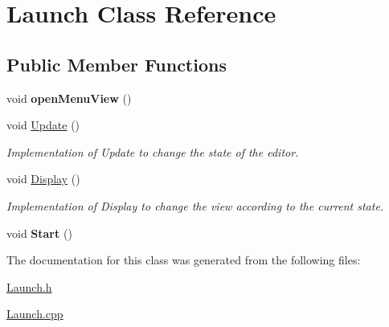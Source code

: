 \hypertarget{class_launch}{}\section{Launch Class Reference}
\label{class_launch}
\subsection*{Public Member Functions}
\begin{DoxyCompactItemize}
\item 
\hypertarget{class_launch_af67db68a994cd8b0dbcde5feba3e1a32}{}\label{class_launch_af67db68a994cd8b0dbcde5feba3e1a32} 
void {\bfseries open\+Menu\+View} ()
\item 
\hypertarget{class_launch_ac5cd36a03a92e7b0e2293c8637d0a4c0}{}\label{class_launch_ac5cd36a03a92e7b0e2293c8637d0a4c0} 
void \hyperlink{class_launch_ac5cd36a03a92e7b0e2293c8637d0a4c0}{Update} ()
\begin{DoxyCompactList}\small\item\em Implementation of Update to change the state of the editor. \end{DoxyCompactList}\item 
\hypertarget{class_launch_aa3e3e4508843b2e7c37155175aa8d70d}{}\label{class_launch_aa3e3e4508843b2e7c37155175aa8d70d} 
void \hyperlink{class_launch_aa3e3e4508843b2e7c37155175aa8d70d}{Display} ()
\begin{DoxyCompactList}\small\item\em Implementation of Display to change the view according to the current state. \end{DoxyCompactList}\item 
\hypertarget{class_launch_afbe00da9ec909271e05b5b54271c87a9}{}\label{class_launch_afbe00da9ec909271e05b5b54271c87a9} 
void {\bfseries Start} ()
\end{DoxyCompactItemize}


The documentation for this class was generated from the following files\+:\begin{DoxyCompactItemize}
\item 
\hyperlink{_launch_8h}{Launch.\+h}\item 
\hyperlink{_launch_8cpp}{Launch.\+cpp}\end{DoxyCompactItemize}
